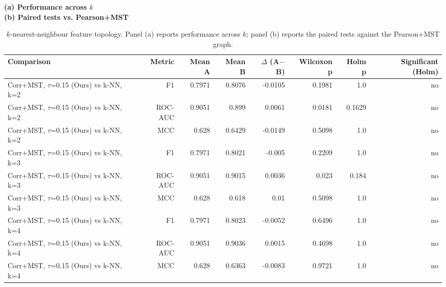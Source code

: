 \begin{table}[t]
\centering
\caption{$k$-nearest-neighbour feature topology. Panel (a) reports performance across $k$; panel (b) reports the paired tests against the Pearson+MST graph.}
\label{tab:knn}
\label{tab:knnstats}
\footnotesize
\textbf{(a) Performance across $k$}\\[2pt]
\vspace{7pt}
\textbf{(b) Paired tests vs. Pearson+MST}\\[2pt]
\begin{tabular}{lrrrrrrr}
\toprule
Comparison & Metric & Mean A & Mean B & $\Delta$ (A$-$B) & Wilcoxon p & Holm p & Significant (Holm) \\
\midrule
Corr+MST, $\tau$=0.15 (Ours) vs k-NN, k=2 & F1 & 0.7971 & 0.8076 & -0.0105 & 0.1981 & 1.0 & no \\
Corr+MST, $\tau$=0.15 (Ours) vs k-NN, k=2 & ROC-AUC & 0.9051 & 0.899 & 0.0061 & 0.0181 & 0.1629 & no \\
Corr+MST, $\tau$=0.15 (Ours) vs k-NN, k=2 & MCC & 0.628 & 0.6429 & -0.0149 & 0.5098 & 1.0 & no \\
Corr+MST, $\tau$=0.15 (Ours) vs k-NN, k=3 & F1 & 0.7971 & 0.8021 & -0.005 & 0.2209 & 1.0 & no \\
Corr+MST, $\tau$=0.15 (Ours) vs k-NN, k=3 & ROC-AUC & 0.9051 & 0.9015 & 0.0036 & 0.023 & 0.184 & no \\
Corr+MST, $\tau$=0.15 (Ours) vs k-NN, k=3 & MCC & 0.628 & 0.618 & 0.01 & 0.5098 & 1.0 & no \\
Corr+MST, $\tau$=0.15 (Ours) vs k-NN, k=4 & F1 & 0.7971 & 0.8023 & -0.0052 & 0.6496 & 1.0 & no \\
Corr+MST, $\tau$=0.15 (Ours) vs k-NN, k=4 & ROC-AUC & 0.9051 & 0.9036 & 0.0015 & 0.4698 & 1.0 & no \\
Corr+MST, $\tau$=0.15 (Ours) vs k-NN, k=4 & MCC & 0.628 & 0.6363 & -0.0083 & 0.9721 & 1.0 & no \\
\bottomrule
\end{tabular}
\end{table}
